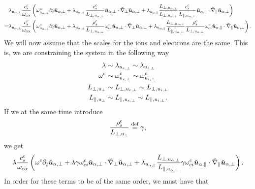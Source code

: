 %
\begin{align*}
    &
 \lambda_{u_{\alpha,\perp}}
 \frac{c^c_s}{\omega_{c\alpha}}
 \left(
 \omega^c_{u_{\alpha,\perp}}
 \partial_{\breve{t}} \breve{\boldsymbol{u}}_{\alpha,\perp}
 +
 \lambda_{u_{\alpha,\perp}}
 \frac{ c^c_s }{L_{\perp, u_{\alpha,\perp}}}
 \breve{\boldsymbol{u}}_{\alpha,\perp}\cdot\breve{\nabla}_\perp\breve{\boldsymbol{u}}_{\alpha,\perp}
 +
 \lambda_{u_{\alpha,\|}}
 \frac{L_{\perp, u_{\alpha,\perp}}}{L_{\perp, u_{\alpha,\perp}}}
 \frac{c^c_s}{L_{\|, u_{\alpha,\perp}}}
 \breve{\boldsymbol{u}}_{\alpha,\|}\cdot\breve{\nabla}_\|\breve{\boldsymbol{u}}_{\alpha,\perp}
 \right)
 \\
 =&
 \lambda_{u_{\alpha,\perp}}
 \frac{c^c_s}{\omega_{c\alpha}}
 \left(
 \omega^c_{u_{\alpha,\perp}}
 \partial_{\breve{t}} \breve{\boldsymbol{u}}_{\alpha,\perp}
 +
 \lambda_{u_{\alpha,\perp}}
 \frac{ \rho^c_s }{L_{\perp, u_{\alpha,\perp}}}
 \omega^c_{ci}
 \breve{\boldsymbol{u}}_{\alpha,\perp}\cdot\breve{\nabla}_\perp\breve{\boldsymbol{u}}_{\alpha,\perp}
 +
 \lambda_{u_{\alpha,\|}}
 \frac{L_{\perp, u_{\alpha,\perp}}}{L_{\|, u_{\alpha,\perp}}}
 \frac{\rho^c_s}{L_{\perp, u_{\alpha,\perp}}}
 \omega^c_{ci}
 \breve{\boldsymbol{u}}_{\alpha,\|}\cdot\breve{\nabla}_\|\breve{\boldsymbol{u}}_{\alpha,\perp}
 \right).
\end{align*}
%
We will now assume that the scales for the ions and electrons are the same.
This is, we are constraining the system in the following way
%
\begin{align*}
    \lambda              &\sim \lambda_{u_{e,\perp}}  \sim \lambda_{u_{i,\perp}} \\
    \omega^c                &\sim \omega^c_{u_{e,\perp}}    \sim \omega^c_{u_{i,\perp}}   \\
    L_{\perp, u_{\perp}} &\sim L_{\perp, u_{e,\perp}} \sim L_{\perp, u_{i,\perp}}\\
    L_{\|, u_{\perp}}    &\sim L_{\|, u_{e,\perp}}    \sim L_{\|, u_{i,\perp}}.
\end{align*}
%
If we at the same time introduce
%
\begin{align*}
    \frac{ \rho^c_s }{L_{\perp, u_{\perp}}} \overset{\text{def}}{=} \gamma,
\end{align*}
%
we get
%
\begin{align}
 \lambda
 \frac{c^c_s}{\omega_{c\alpha}}
 \left(
 \omega^c
 \partial_{\breve{t}} \breve{\boldsymbol{u}}_{\alpha,\perp}
 +
 \lambda
 \gamma
 \omega^c_{ci}
 \breve{\boldsymbol{u}}_{\alpha,\perp}\cdot\breve{\nabla}_\perp\breve{\boldsymbol{u}}_{\alpha,\perp}
 +
 \lambda_{u_{\alpha,\|}}
 \frac{L_{\perp, u_{\alpha,\perp}}}{L_{\|, u_{\alpha,\perp}}}
 \gamma
 \omega^c_{ci}
 \breve{\boldsymbol{u}}_{\alpha,\|}\cdot\breve{\nabla}_\|\breve{\boldsymbol{u}}_{\alpha,\perp}
 \right).
 \label{eq:doLHSAfterFirstConstraint}
\end{align}
%
In order for these terms to  be of the same order, we must have that
